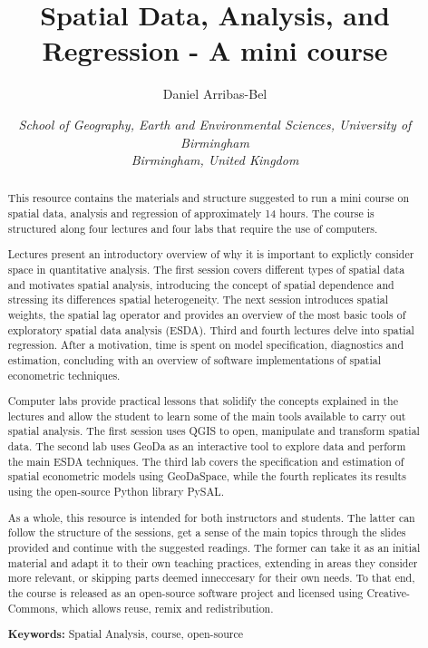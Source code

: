 \documentclass[12pt, a4paper]{article}
\begin{document}
\renewcommand{\baselinestretch}{1}
\title{\bfseries Spatial Data, Analysis, and Regression - A mini course } 
\bigskip
\author{Daniel Arribas-Bel \bigskip 
\and 
{\small { \emph{School of Geography, Earth and Environmental Sciences,
University of Birmingham}}}  \\
{\small  {\emph{Birmingham, United Kingdom}}}  \\
\bigskip}
\date{}
\maketitle

\begin{abstract}
    
This resource contains the materials and structure suggested to run a mini
course on spatial data, analysis and regression of approximately 14 hours. The
course is structured along four lectures and four labs that require the use of
computers.

Lectures present an introductory overview of why it is important to explictly
consider space in quantitative analysis. The first session covers different
types of spatial data and motivates spatial analysis, introducing the concept
of spatial dependence and stressing its differences spatial heterogeneity. The
next session introduces spatial weights, the spatial lag operator and provides
an overview of the most basic tools of exploratory spatial data analysis
(ESDA). Third and fourth lectures delve into spatial regression. After a
motivation, time is spent on model specification, diagnostics and estimation,
concluding with an overview of software implementations of spatial econometric
techniques.

Computer labs provide practical lessons that solidify the concepts explained
in the lectures and allow the student to learn some of the main tools
available to carry out spatial analysis. The first session uses QGIS to open,
manipulate and transform spatial data. The second lab uses GeoDa as an
interactive tool to explore data and perform the main ESDA techniques. The
third lab covers the specification and estimation of spatial econometric
models using GeoDaSpace, while the fourth replicates its results using the
open-source Python library PySAL.

As a whole, this resource is intended for both instructors and students. The
latter can follow the structure of the sessions, get a sense of the main
topics through the slides provided and continue with the suggested readings.
The former can take it as an initial material and adapt it to their own
teaching practices, extending in areas they consider more relevant, or
skipping parts deemed inneccesary for their own needs. To that end, the course
is released as an open-source software project and licensed using
Creative-Commons, which allows reuse, remix and redistribution.

\bigskip

{\noindent\small 
\textbf{Keywords:} Spatial Analysis, course, open-source
}
\end{abstract}

\clearpage
\end{document}
